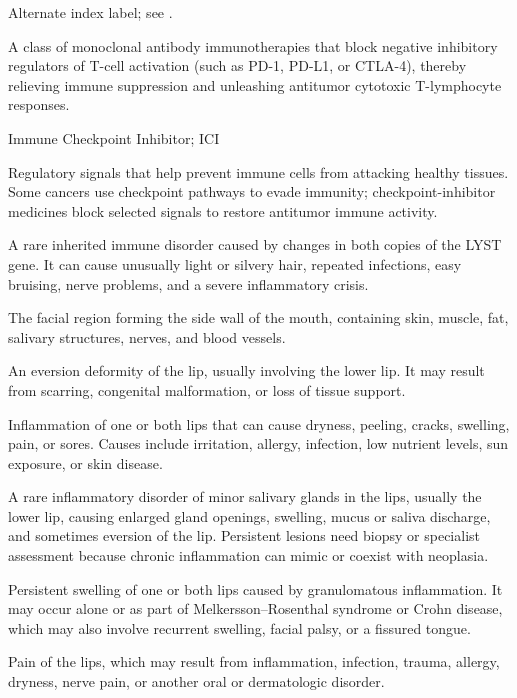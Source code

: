  Alternate index label; see .

 A class of monoclonal antibody immunotherapies that block negative inhibitory regulators of T-cell activation (such as PD-1, PD-L1, or CTLA-4), thereby relieving immune suppression and unleashing antitumor cytotoxic T-lymphocyte responses.

\synonyms
Immune Checkpoint Inhibitor; ICI

 Regulatory signals that help prevent immune cells from attacking healthy tissues. Some cancers use checkpoint pathways to evade immunity; checkpoint-inhibitor medicines block selected signals to restore antitumor immune activity.

 A rare inherited immune disorder caused by changes in both copies of the LYST gene. It can cause unusually light or silvery hair, repeated infections, easy bruising, nerve problems, and a severe inflammatory crisis.

 The facial region forming the side wall of the mouth, containing skin, muscle, fat, salivary structures, nerves, and blood vessels.

 An eversion deformity of the lip, usually involving the lower lip. It may result from
scarring, congenital malformation, or loss of tissue support.

 Inflammation of one or both lips that can cause dryness, peeling, cracks, swelling, pain, or sores. Causes include irritation, allergy, infection, low nutrient levels, sun exposure, or skin disease.

 A rare inflammatory disorder of minor salivary glands in the lips, usually the lower lip, causing enlarged gland openings, swelling, mucus or saliva discharge, and sometimes eversion of the lip. Persistent lesions need biopsy or specialist assessment because chronic inflammation can mimic or coexist with neoplasia.

 Persistent swelling of one or both lips caused by granulomatous inflammation. It may occur alone or as part of Melkersson--Rosenthal syndrome or Crohn disease, which may also involve recurrent swelling, facial palsy, or a fissured tongue.

 Pain of the lips, which may result from inflammation, infection, trauma, allergy, dryness, nerve pain, or another oral or dermatologic disorder.

